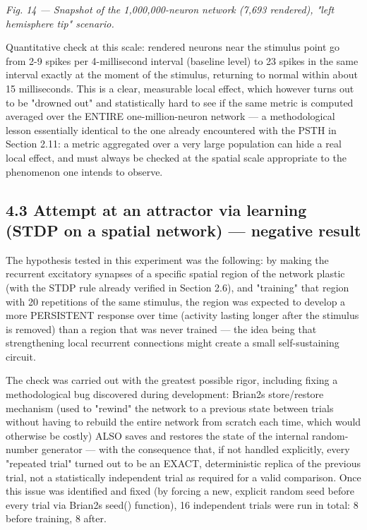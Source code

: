 \documentclass[
  english,
]{article}
\begin{document}
\emph{Fig. 14 --- Snapshot of the 1,000,000-neuron network (7,693 rendered), "left hemisphere tip" scenario.}

Quantitative check at this scale: rendered neurons near the stimulus point go from 2-9 spikes per 4-millisecond interval (baseline level) to 23 spikes in the same interval exactly at the moment of the stimulus, returning to normal within about 15 milliseconds. This is a clear, measurable local effect, which however turns out to be "drowned out" and statistically hard to see if the same metric is computed averaged over the ENTIRE one-million-neuron network --- a methodological lesson essentially identical to the one already encountered with the PSTH in Section 2.11: a metric aggregated over a very large population can hide a real local effect, and must always be checked at the spatial scale appropriate to the phenomenon one intends to observe.

\subsection{4.3 Attempt at an attractor via learning (STDP on a spatial network) --- negative result}\label{attempt-at-an-attractor-via-learning-stdp-on-a-spatial-network-negative-result}

The hypothesis tested in this experiment was the following: by making the recurrent excitatory synapses of a specific spatial region of the network plastic (with the STDP rule already verified in Section 2.6), and "training" that region with 20 repetitions of the same stimulus, the region was expected to develop a more PERSISTENT response over time (activity lasting longer after the stimulus is removed) than a region that was never trained --- the idea being that strengthening local recurrent connections might create a small self-sustaining circuit.

The check was carried out with the greatest possible rigor, including fixing a methodological bug discovered during development: Brian2\textquotesingle s store/restore mechanism (used to "rewind" the network to a previous state between trials without having to rebuild the entire network from scratch each time, which would otherwise be costly) ALSO saves and restores the state of the internal random-number generator --- with the consequence that, if not handled explicitly, every "repeated trial" turned out to be an EXACT, deterministic replica of the previous trial, not a statistically independent trial as required for a valid comparison. Once this issue was identified and fixed (by forcing a new, explicit random seed before every trial via Brian2\textquotesingle s seed() function), 16 independent trials were run in total: 8 before training, 8 after.
\end{document}

